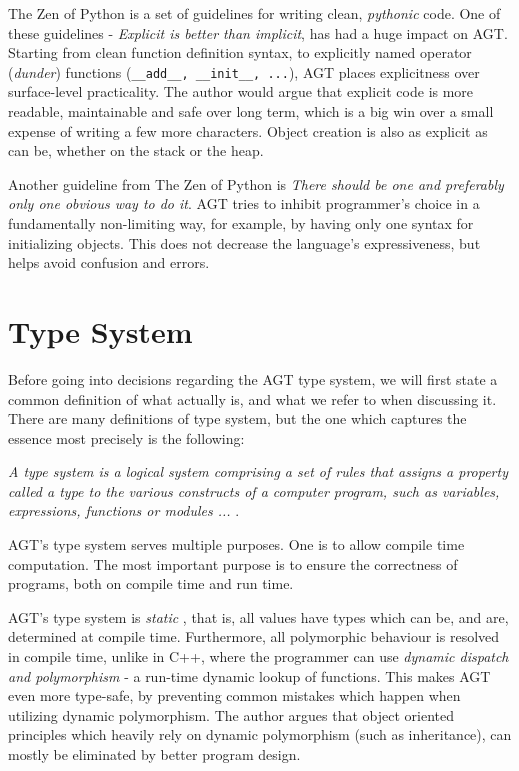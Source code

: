 \documentclass[times, utf8, diplomski]{fer}
\theoremstyle{definition}
\begin{document}
The Zen of Python \citep{c_zen} is a set of guidelines for writing clean, \textit{pythonic} code. 
One of these guidelines - \textit{Explicit is better than implicit}, has had a huge impact on AGT.
Starting from clean function definition syntax, to explicitly named operator (\textit{dunder}) functions
(\texttt{\_\_add\_\_, \_\_init\_\_, ...}), AGT places explicitness over surface-level practicality.
The author would argue that explicit code is more readable, maintainable and safe over long term,
which is a big win over a small expense of writing a few more characters.
Object creation is also as explicit as can be, whether on the stack or the heap.

Another guideline from The Zen of Python is 
\textit{There should be one and preferably only one obvious way to do it}. 
AGT tries to inhibit programmer's choice in a fundamentally non-limiting way, for example, by
having only one syntax for initializing objects. This does not decrease the 
language's expressiveness, but helps avoid confusion and errors.

\section{Type System}

Before going into decisions regarding the AGT type system, we will first state a common
definition of what  actually is, and what we refer to when discussing it.
There are many definitions of type system, 
but the one which captures the essence most precisely is the following:

\textit{A type system is a logical system comprising a set of rules that 
    assigns a property called a type to the various constructs of a computer program, 
such as variables, expressions, functions or modules ... }\citep{c_type_system}.

AGT's type system serves multiple purposes. One is to allow compile time computation.
The most important purpose is to ensure the correctness of programs, both on compile time and run time.

AGT's type system is \textit{static} \citep{c_static_typing}, that is, 
all values have types which can be, and are, determined
at compile time. Furthermore, all polymorphic behaviour is resolved in compile time, unlike in C++,
where the programmer can use \textit{dynamic dispatch and polymorphism} \citep{c_dyn_dispatch} 
- a run-time dynamic lookup of functions.
This makes AGT even more type-safe, by preventing common mistakes which happen when utilizing
dynamic polymorphism. The author argues that object oriented principles which heavily rely on
dynamic polymorphism (such as inheritance), can mostly be eliminated by better program design.
\end{document}
